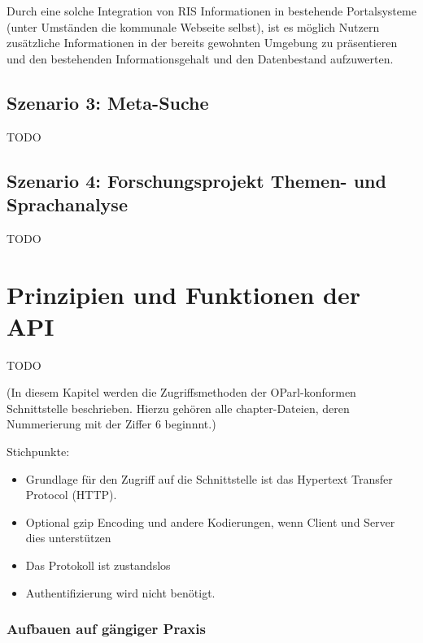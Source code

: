 \documentclass[,a4paper]{article}
\begin{document}
Durch eine solche Integration von RIS Informationen in bestehende
Portalsysteme (unter Umständen die kommunale Webseite selbst), ist es
möglich Nutzern zusätzliche Informationen in der bereits gewohnten
Umgebung zu präsentieren und den bestehenden Informationsgehalt und den
Datenbestand aufzuwerten.

\subsection{Szenario 3: Meta-Suche}\label{szenarioux5fmetaux5fsuche}

TODO

\subsection{Szenario 4: Forschungsprojekt Themen- und
Sprachanalyse}\label{szenarioux5fforschung}

TODO

\section{Prinzipien und Funktionen der
API}\label{prinzipien-und-funktionen-der-api}

TODO

(In diesem Kapitel werden die Zugriffsmethoden der OParl-konformen
Schnittstelle beschrieben. Hierzu gehören alle chapter-Dateien, deren
Nummerierung mit der Ziffer 6 beginnnt.)

Stichpunkte:

\begin{itemize}
\itemsep1pt\parskip0pt
\item
  Grundlage für den Zugriff auf die Schnittstelle ist das Hypertext
  Transfer Protocol (HTTP).
\item
  Optional gzip Encoding und andere Kodierungen, wenn Client und Server
  dies unterstützen
\item
  Das Protokoll ist zustandslos
\item
  Authentifizierung wird nicht benötigt.
\end{itemize}


\subsubsection{Aufbauen auf gängiger
Praxis}\label{aufbauen-auf-guxe4ngiger-praxis}
\end{document}
